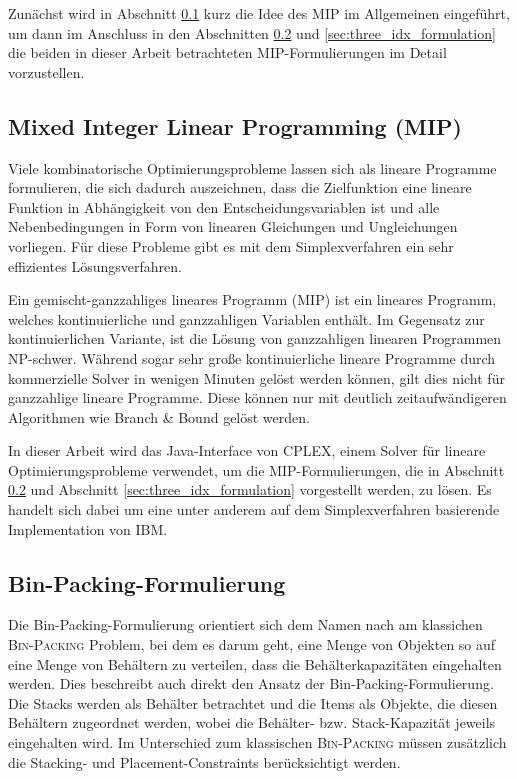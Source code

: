 Zunächst wird in Abschnitt \ref{sec:mip_definition} kurz die Idee des MIP im Allgemeinen
eingeführt, um dann im Anschluss in den Abschnitten \ref{sec:bin_packing_formulation} und \ref{sec:three_idx_formulation} die beiden in dieser Arbeit betrachteten MIP-Formulierungen im Detail vorzustellen.

\subsection{Mixed Integer Linear Programming (MIP)}
\label{sec:mip_definition}

Viele kombinatorische Optimierungsprobleme lassen sich als lineare Programme formulieren, die sich dadurch
auszeichnen, dass die Zielfunktion eine lineare Funktion in Abhängigkeit von den Entscheidungsvariablen ist
und alle Nebenbedingungen in Form von linearen Gleichungen und Ungleichungen vorliegen. Für diese Probleme gibt es mit dem Simplexverfahren ein sehr effizientes Lösungsverfahren.\cite{Knust2017}

Ein gemischt-ganzzahliges lineares Programm (MIP) ist ein lineares Programm, welches kontinuierliche und ganzzahligen Variablen
enthält. Im Gegensatz zur kontinuierlichen Variante, ist die Lösung von ganzzahligen linearen Programmen NP-schwer.
Während sogar sehr große kontinuierliche lineare Programme durch kommerzielle Solver in wenigen Minuten gelöst werden können, gilt dies nicht für ganzzahlige lineare Programme. Diese können nur mit deutlich zeitaufwändigeren Algorithmen wie Branch \& Bound gelöst werden.\cite{Brucker2006}

In dieser Arbeit wird das Java-Interface von CPLEX, einem Solver für lineare Optimierungsprobleme verwendet,
um die MIP-Formulierungen, die in Abschnitt \ref{sec:bin_packing_formulation} und Abschnitt \ref{sec:three_idx_formulation} vorgestellt werden,
zu lösen. Es handelt sich dabei um eine unter anderem auf dem Simplexverfahren basierende Implementation von IBM. \cite{CPLEX2015}

\pagebreak

\subsection{Bin-Packing-Formulierung}
\label{sec:bin_packing_formulation}

Die Bin-Packing-Formulierung orientiert sich dem Namen nach am klassichen \textsc{Bin-Packing} Problem, bei dem es darum geht,
eine Menge von Objekten so auf eine Menge von Behältern zu verteilen, dass die Behälterkapazitäten eingehalten werden.
Dies beschreibt auch direkt den Ansatz der Bin-Packing-Formulierung. Die Stacks werden als Behälter betrachtet und die Items als Objekte,
die diesen Behältern zugeordnet werden, wobei die Behälter- bzw. Stack-Kapazität jeweils eingehalten wird. Im Unterschied zum klassischen \textsc{Bin-Packing} müssen zusätzlich die Stacking- und Placement-Constraints berücksichtigt werden.

